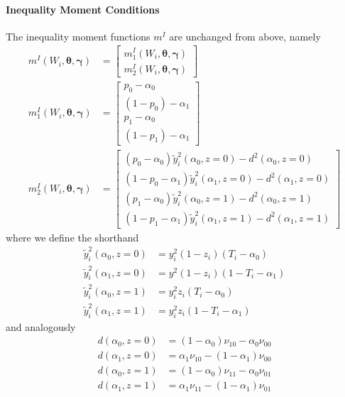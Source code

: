 \documentclass[12pt]{article}
\begin{document}
\paragraph{Inequality Moment Conditions}
The inequality moment functions $m^I$ are unchanged from above, namely
\begin{align*}
  m^I(W_i, \boldsymbol{\theta}, \boldsymbol{\gamma}) &=
  \left[
  \begin{array}{l}
    m_1^I(W_i, \boldsymbol{\theta}, \boldsymbol{\gamma}) \\ 
    m_2^I(W_i, \boldsymbol{\theta}, \boldsymbol{\gamma}) 
  \end{array}
\right] \\
  m_1^I(W_i, \boldsymbol{\theta}, \boldsymbol{\gamma}) &=
  \left[
  \begin{array}{r}
  p_0 - \alpha_0 \\
  (1 - p_0) - \alpha_1  \\
  p_1 - \alpha_0 \\
  (1 - p_1) - \alpha_1  
  \end{array}
\right]\\
m_2^I(W_i, \boldsymbol{\theta}, \boldsymbol{\gamma}) &=
\left[
\begin{array}{r}
  (p_0 - \alpha_0) \widetilde{y}_i^2(\alpha_0,z=0) - d^2(\alpha_0,z=0)\\
  (1- p_0 - \alpha_1) \widetilde{y}^2_i(\alpha_1,z=0) - d^2(\alpha_1,z=0)\\
  (p_1 - \alpha_0) \widetilde{y}^2_i(\alpha_0,z=1) - d^2(\alpha_0,z=1)\\
  (1- p_1 - \alpha_1) \widetilde{y}_i^2(\alpha_1,z=1) -  d^2(\alpha_1,z=1)
\end{array}
\right]
\end{align*}
where we define the shorthand
\begin{align*}
  \widetilde{y}_i^2(\alpha_0, z=0) &= y_i^2 (1 - z_i)(T_i - \alpha_0)\\ 
  \widetilde{y}_i^2(\alpha_1, z=0) &= y^2 (1-z_i)(1 - T_i - \alpha_1) \\
  \widetilde{y}_i^2(\alpha_0, z=1) &= y^2_i z_i(T_i - \alpha_0) \\
  \widetilde{y}_i^2(\alpha_1, z=1) &= y_i^2 z_i(1 - T_i - \alpha_1)
\end{align*}
and analogously
\begin{align*}
  d(\alpha_0,z=0) &=(1 - \alpha_0) \nu_{10} - \alpha_0 \nu_{00} \\ 
  d(\alpha_1, z=0) &=\alpha_1 \nu_{10} - (1 - \alpha_1)\nu_{00} \\
  d(\alpha_0, z=1) &=(1 - \alpha_0) \nu_{11} - \alpha_0 \nu_{01} \\
  d(\alpha_1, z=1) &=\alpha_1 \nu_{11} - (1 - \alpha_1)\nu_{01}
\end{align*}
\end{document}
